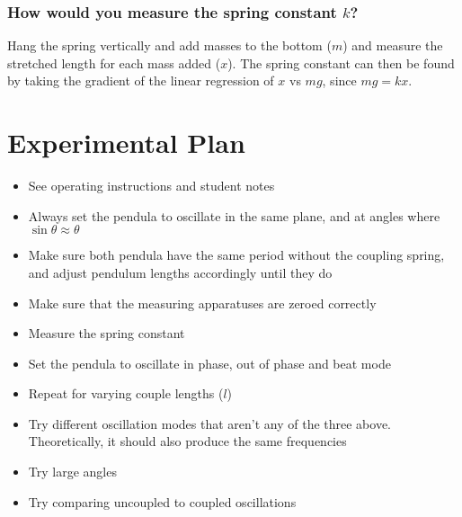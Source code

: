 \documentclass[a4paper]{scrartcl}
\begin{document}
\subsubsection{How would you measure the spring constant \(k\)?}
Hang the spring vertically and add masses to the bottom (\(m\)) and measure the stretched length for each mass added (\(x\)). The spring constant can then be found by taking the gradient of the linear regression of \(x\) vs \(m g\), since \(m g = k x\).

\section{Experimental Plan}
\begin{itemize}
    \item See operating instructions and student notes
    \item Always set the pendula to oscillate in the same plane, and at angles where \(\sin \theta \approx \theta\)
    \item Make sure both pendula have the same period without the coupling spring, and adjust pendulum lengths accordingly until they do
    \item Make sure that the measuring apparatuses are zeroed correctly
    \item Measure the spring constant
    \item Set the pendula to oscillate in phase, out of phase and beat mode
    \item Repeat for varying couple lengths (\(l\))
    \item Try different oscillation modes that aren't any of the three above. Theoretically, it should also produce the same frequencies
    \item Try large angles
    \item Try comparing uncoupled to coupled oscillations
\end{itemize}
\end{document}
